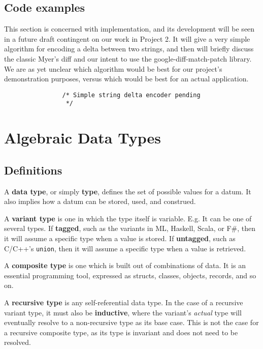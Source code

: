 \documentclass[12pt,a4paper]{article}
\begin{document}
		\subsection{Code examples}
		
		This section is concerned with implementation, and its development will be seen in a future draft contingent on our work in Project 2. It will give a very simple algorithm for encoding a delta between two strings, and then will briefly discuss the classic Myer's diff\cite{Myers} and our intent to use the google-diff-match-patch library. We are as yet unclear which algorithm would be best for our project's demonstration purposes, versus which would be best for an actual application.
		
			\begin{lstlisting}
				/* Simple string delta encoder pending
				 */
			\end{lstlisting}
	
	\section{Algebraic Data Types}
		
		\subsection{Definitions}
		
		A \textbf{data type}, or simply \textbf{type}, defines the set of possible values for a datum. It also implies how a datum can be stored, used, and construed.
		
		A \textbf{variant type} is one in which the type itself is variable. E.g. It can be one of several types. If \textbf{tagged}, such as the variants in ML, Haskell, Scala, or F\#, then it will assume a specific type when a value is stored. If \textbf{untagged}, such as C/C++'s \texttt{union}, then it will assume a specific type when a value is retrieved.
		
		A \textbf{composite type} is one which is built out of combinations of data. It is an essential programming tool, expressed as structs, classes, objects, records, and so on.
		
		A \textbf{recursive type} is any self-referential data type. In the case of a recursive variant type, it must also be \textbf{inductive}, where the variant's \textit{actual} type will eventually resolve to a non-recursive type as its base case. This is not the case for a recursive composite type, as its type is invariant and does not need to be resolved.
				
\end{document}
